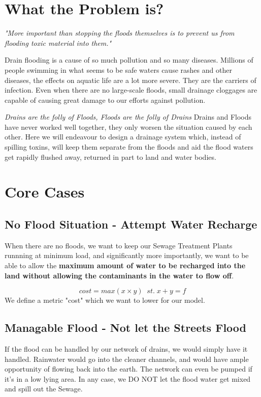 \documentclass{article}
\newcounter{def}[section]\setcounter{def}{0}
\begin{document}
\section{What the Problem is?}

\emph{"More important than stopping the floods themselves is to prevent us from flooding toxic material into them."}

Drain flooding is a cause of so much pollution and so many diseases. Millions of people swimming in what seems to be safe waters cause rashes and other diseases, the effects on aquatic life are a lot more severe. They are the carriers of infection. Even when there are no large-scale floods, small drainage cloggages are capable of causing great damage to our efforts against pollution.

\emph{Drains are the folly of Floods, Floods are the folly of Drains}
Drains and Floods have never worked well together, they only worsen the situation caused by each other. Here we will endeavour to design a drainage system which, instead of spilling toxins, will keep them separate from the floods and aid the flood waters get rapidly flushed away, returned in part to land and water bodies.

\section{Core Cases}

\subsection{No Flood Situation - Attempt Water Recharge}

When there are no floods, we want to keep our Sewage Treatment Plants runnning at minimum load, and significantly more importantly, we want to be able to allow the \textbf{maximum amount of water to be recharged into the land without allowing the contaminants in the water to flow off}.

\begin{equation*}
    cost = max (x \times y) \;\;st.\;x + y = f 
\end{equation*}
We define a metric "cost" which we want to lower for our model. 

\subsection{Managable Flood - Not let the Streets Flood}

If the flood can be handled by our network of drains, we would simply have it handled. Rainwater would go into the cleaner channels, and would have ample opportunity of flowing back into the earth. The network can even be pumped if it's in a low lying area. In any case, we DO NOT let the flood water get mixed and spill out the Sewage.
\end{document}
